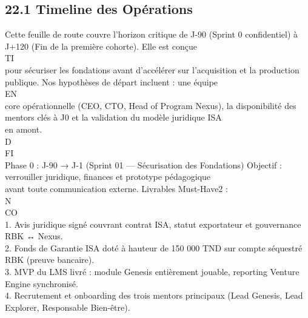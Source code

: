 \documentclass[12pt,landscape,a4paper]{article}
\begin{document}
\subsection{22.1 Timeline des Opérations}
Cette feuille de route couvre l’horizon critique de J-90 (Sprint 0 confidentiel) à J+120 (Fin de la première cohorte). Elle est conçue\\
\vspace{0.5em}
\vspace{0.5em}
\vspace{0.5em}
\vspace{0.5em}
TI\\
pour sécuriser les fondations avant d’accélérer sur l’acquisition et la production publique. Nos hypothèses de départ incluent : une équipe\\
\vspace{0.5em}
\vspace{0.5em}
\vspace{0.5em}
\vspace{0.5em}
EN\\
core opérationnelle (CEO, CTO, Head of Program Nexus), la disponibilité des mentors clés à J0 et la validation du modèle juridique ISA\\
en amont.\\
\vspace{0.5em}
\vspace{0.5em}
\vspace{0.5em}
\vspace{0.5em}
D\\
FI\\
Phase 0 : J-90 → J-1 (Sprint 01 — Sécurisation des Fondations) Objectif : verrouiller juridique, finances et prototype pédagogique\\
avant toute communication externe. Livrables Must-Have2 :\\
N\\
CO\\
1. Avis juridique signé couvrant contrat ISA, statut exportateur et gouvernance RBK ↔ Nexus.\\
\vspace{0.5em}
2. Fonds de Garantie ISA doté à hauteur de 150 000 TND sur compte séquestré RBK (preuve bancaire).\\
\vspace{0.5em}
3. MVP du LMS livré : module Genesis entièrement jouable, reporting Venture Engine synchronisé.\\
\vspace{0.5em}
4. Recrutement et onboarding des trois mentors principaux (Lead Genesis, Lead Explorer, Responsable Bien-être).\\
\end{document}
